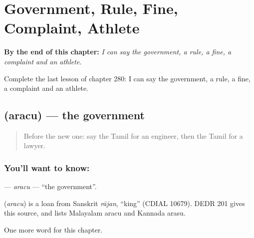 
\chapter{Government, Rule, Fine, Complaint, Athlete}
\label{ch:ta-government-rule-fine-complaint-athlete}

\begin{chapteropening}
\textbf{By the end of this chapter:} \emph{I can say the government, a rule, a fine, a complaint and an athlete.}

Complete the last lesson of chapter 280: I can say the government, a rule, a fine, a complaint and an athlete.
\end{chapteropening}

\section[\texorpdfstring{\ta{அரசு} (aracu)}{அரசு (aracu)}]{ (aracu) — the government}

\label{lesson:TA-C280-aracu}



\begin{quote}
Before the new one: say the Tamil for an engineer, then the Tamil for a lawyer.
\end{quote}

\subsection*{You'll want to know: }
\textbf{} — \emph{aracu} — \textquotedblleft{}the government\textquotedblright{}.

\begin{cousinweb}
\textbf{} (\emph{aracu}) is a loan from Sanskrit \emph{rājan}, \textquotedblleft{}king\textquotedblright{} (CDIAL 10679). DEDR 201 gives this source, and lists Malayalam aracu and Kannada arasu.
\end{cousinweb}

\begin{grammarlens}[title={What you've built}]
One more word for this chapter.
\end{grammarlens}

